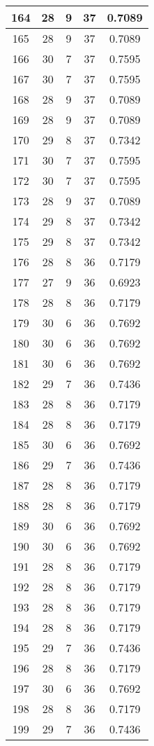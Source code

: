 \documentclass[letterpaper, 12pt]{article}
\begin{document}
\begin{longtable}{|c|c|c|c|c|}
\hline
164 & 28 & 9 & 37 & 0.7089 \\
\hline
165 & 28 & 9 & 37 & 0.7089 \\
\hline
166 & 30 & 7 & 37 & 0.7595 \\
\hline
167 & 30 & 7 & 37 & 0.7595 \\
\hline
168 & 28 & 9 & 37 & 0.7089 \\
\hline
169 & 28 & 9 & 37 & 0.7089 \\
\hline
170 & 29 & 8 & 37 & 0.7342 \\
\hline
171 & 30 & 7 & 37 & 0.7595 \\
\hline
172 & 30 & 7 & 37 & 0.7595 \\
\hline
173 & 28 & 9 & 37 & 0.7089 \\
\hline
174 & 29 & 8 & 37 & 0.7342 \\
\hline
175 & 29 & 8 & 37 & 0.7342 \\
\hline
176 & 28 & 8 & 36 & 0.7179 \\
\hline
177 & 27 & 9 & 36 & 0.6923 \\
\hline
178 & 28 & 8 & 36 & 0.7179 \\
\hline
179 & 30 & 6 & 36 & 0.7692 \\
\hline
180 & 30 & 6 & 36 & 0.7692 \\
\hline
181 & 30 & 6 & 36 & 0.7692 \\
\hline
182 & 29 & 7 & 36 & 0.7436 \\
\hline
183 & 28 & 8 & 36 & 0.7179 \\
\hline
184 & 28 & 8 & 36 & 0.7179 \\
\hline
185 & 30 & 6 & 36 & 0.7692 \\
\hline
186 & 29 & 7 & 36 & 0.7436 \\
\hline
187 & 28 & 8 & 36 & 0.7179 \\
\hline
188 & 28 & 8 & 36 & 0.7179 \\
\hline
189 & 30 & 6 & 36 & 0.7692 \\
\hline
190 & 30 & 6 & 36 & 0.7692 \\
\hline
191 & 28 & 8 & 36 & 0.7179 \\
\hline
192 & 28 & 8 & 36 & 0.7179 \\
\hline
193 & 28 & 8 & 36 & 0.7179 \\
\hline
194 & 28 & 8 & 36 & 0.7179 \\
\hline
195 & 29 & 7 & 36 & 0.7436 \\
\hline
196 & 28 & 8 & 36 & 0.7179 \\
\hline
197 & 30 & 6 & 36 & 0.7692 \\
\hline
198 & 28 & 8 & 36 & 0.7179 \\
\hline
199 & 29 & 7 & 36 & 0.7436 \\
\hline
\end{longtable}
\end{document}
